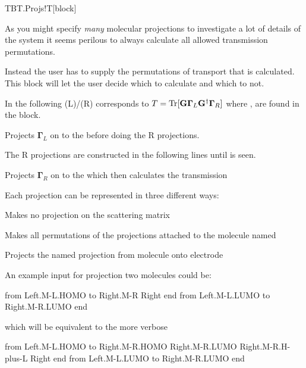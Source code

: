 \begin{fdfentry}{TBT.Projs!T}[block]%

  As you might specify \emph{many} molecular projections to
  investigate a lot of details of the system it seems perilous to
  always calculate all allowed transmission permutations.

  Instead the user has to supply the permutations of transport that is
  calculated. This block will let the user decide which to calculate
  and which to not.

  In the following (L)/(R) corresponds to
  $T=\operatorname{Tr}[\mathbf G\boldsymbol\Gamma_L\mathbf
  G^\dagger\boldsymbol\Gamma_R]$
  where ,  are found in the 
  block.

  \begin{fdfoptions}

    Projects $\boldsymbol\Gamma_L$ on to the 
    before doing the R projections.

    The R projections are constructed in the following lines until
     is seen.

    \begin{fdfoptions}
      
      \option[<proj-R>]%
      Projects $\boldsymbol\Gamma_R$ on to the 
      which then calculates the transmission
    \end{fdfoptions}
  
  \end{fdfoptions}

  Each projection can be represented in three different ways:

  \begin{fdfoptions}
    
    \option[<elec>] %
    Makes no projection on the scattering matrix

    Makes all permutations of the projections attached to the molecule
    named 
  
    Projects the named projection  from molecule
     onto electrode 

  \end{fdfoptions}

  An example input for projection two molecules could be:
  \begin{fdfexample}
   from Left.M-L.HOMO to
     Right.M-R
     Right
   end
   from Left.M-L.LUMO to
     Right.M-R.LUMO
   end
  \end{fdfexample}
  which will be equivalent to the more verbose
  \begin{fdfexample}
   from Left.M-L.HOMO to
     Right.M-R.HOMO
     Right.M-R.LUMO
     Right.M-R.H-plus-L
     Right
   end
   from Left.M-L.LUMO to
     Right.M-R.LUMO
   end
  \end{fdfexample}
  
\end{fdfentry}

